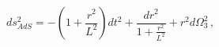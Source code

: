 \begin{equation}
ds^2_{AdS}=-(1+\frac{r^2}{L^2})dt^2+\frac{dr^2}{1+\frac{r^2}{L^2}}+
r^2 d\Omega_3^2\, ,
\end{equation}

